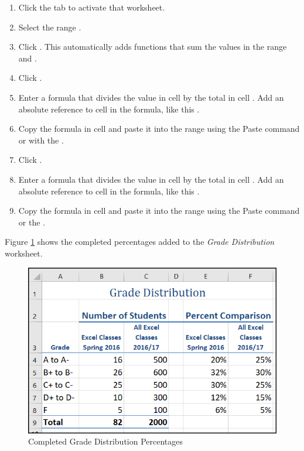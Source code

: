 \begin{enumbox}
	\begin{enumerate}
		\item Click the  tab to activate that worksheet.
		\item Select the range .
		\item Click . This automatically adds  functions that sum the values in the range  and .
		\item Click .
		\item Enter a formula that divides the value in cell  by the total in cell . Add an absolute reference to cell  in the formula, like this .
		\item Copy the formula in cell  and paste it into the range  using the Paste command or with the .
		\item Click .
		\item Enter a formula that divides the value in cell  by the total in cell . Add an absolute reference to cell  in the formula, like this .
		\item Copy the formula in cell  and paste it into the range  using the Paste command or the .
	\end{enumerate}
\end{enumbox}
	
Figure \ref{04:fig17} shows the completed percentages added to the \textit{Grade Distribution} worksheet.

\begin{figure}[H]
	\centering
	\includegraphics[width=\maxwidth{.95\linewidth}]{gfx/ch04_fig17}
	\caption{Completed Grade Distribution Percentages}
	\label{04:fig17}
\end{figure}

